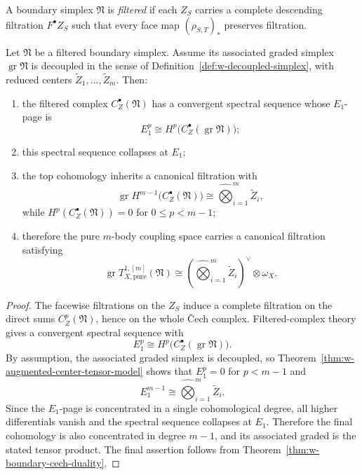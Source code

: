 \begin{definition}
\label{def:w-filtered-boundary-simplex}
A boundary simplex $\mathfrak N$ is \emph{filtered} if each $Z_S$ carries a complete descending filtration
$F^\bullet Z_S$ such that every face map $(\rho_{S,T})_*$ preserves filtration.
\end{definition}

\begin{theorem}
\label{thm:w-filtered-stability-pure-mbody}
Let $\mathfrak N$ be a filtered boundary simplex. Assume its associated graded simplex
$\operatorname{gr}\mathfrak N$ is decoupled in the sense of Definition~\ref{def:w-decoupled-simplex}, with reduced
centers $\widetilde Z_1,\dots,\widetilde Z_m$. Then:
\begin{enumerate}[label=(\alph*)]
\item the filtered complex $C_Z^\bullet(\mathfrak N)$ has a convergent spectral sequence whose $E_1$-page is
\[
E_1^p \cong H^p\bigl(C_Z^\bullet(\operatorname{gr}\mathfrak N)\bigr);
\]
\item this spectral sequence collapses at $E_1$;
\item the top cohomology inherits a canonical filtration with
\[
\operatorname{gr}H^{m-1}\bigl(C_Z^\bullet(\mathfrak N)\bigr)
\cong
\widehat\bigotimes_{i=1}^m \widetilde Z_i,
\]
while $H^p(C_Z^\bullet(\mathfrak N))=0$ for $0\le p<m-1$;
\item therefore the pure $m$-body coupling space carries a canonical filtration satisfying
\[
\operatorname{gr}T^{1,[m]}_{X,\mathrm{pure}}(\mathfrak N)
\cong
\left(\widehat\bigotimes_{i=1}^m \widetilde Z_i\right)^\vee\otimes \omega_X.
\]
\end{enumerate}
\end{theorem}

\begin{proof}
The facewise filtrations on the $Z_S$ induce a complete filtration on the direct sums
$C_Z^p(\mathfrak N)$, hence on the whole \v{C}ech complex. Filtered-complex theory gives a convergent
spectral sequence with
\[
E_1^p\cong H^p\bigl(C_Z^\bullet(\operatorname{gr}\mathfrak N)\bigr).
\]
By assumption, the associated graded simplex is decoupled, so Theorem~\ref{thm:w-augmented-center-tensor-model}
shows that $E_1^p=0$ for $p<m-1$ and
\[
E_1^{m-1}\cong \widehat\bigotimes_{i=1}^m \widetilde Z_i.
\]
Since the $E_1$-page is concentrated in a single cohomological degree, all higher differentials vanish and the
spectral sequence collapses at $E_1$. Therefore the final cohomology is also concentrated in degree $m-1$, and its
associated graded is the stated tensor product. The final assertion follows from Theorem~\ref{thm:w-boundary-cech-duality}.
\end{proof}

